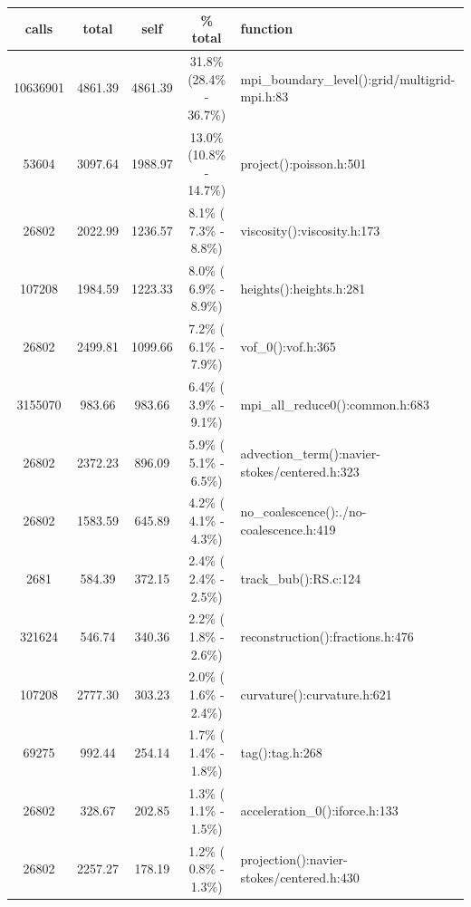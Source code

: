 \begin{table}  
\begin{tabular}{c|c|c|c|l}
  calls  &  total  &   self  & \% total  & function \\ \hline
  10636901 &  4861.39 &  4861.39  &   31.8\% (28.4\% - 36.7\%) &   mpi\_boundary\_level():grid/multigrid-mpi.h:83\\
     53604 &  3097.64 &  1988.97  &   13.0\% (10.8\% - 14.7\%) &   project():poisson.h:501\\
     26802 &  2022.99 &  1236.57  &    8.1\% ( 7.3\% -  8.8\%) &   viscosity():viscosity.h:173\\
    107208 &  1984.59 &  1223.33  &    8.0\% ( 6.9\% -  8.9\%) &   heights():heights.h:281\\
     26802 &  2499.81 &  1099.66  &    7.2\% ( 6.1\% -  7.9\%) &   vof\_0():vof.h:365\\
   3155070 &  983.66  & 983.66    &  6.4\% ( 3.9\% -  9.1\%)   & mpi\_all\_reduce0():common.h:683\\
     26802 &  2372.23 &  896.09   &   5.9\% ( 5.1\% -  6.5\%)  &  advection\_term():navier-stokes/centered.h:323\\
     26802 &  1583.59 &  645.89   &   4.2\% ( 4.1\% -  4.3\%)  &  no\_coalescence():./no-coalescence.h:419\\
      2681 &  584.39  & 372.15    &  2.4\% ( 2.4\% -  2.5\%)   & track\_bub():RS.c:124\\
    321624 &  546.74  & 340.36    &  2.2\% ( 1.8\% -  2.6\%)   & reconstruction():fractions.h:476\\
    107208 &  2777.30 &  303.23   &   2.0\% ( 1.6\% -  2.4\%)  &  curvature():curvature.h:621\\
     69275 &  992.44  & 254.14    &  1.7\% ( 1.4\% -  1.8\%)   & tag():tag.h:268\\
     26802 &  328.67  & 202.85    &  1.3\% ( 1.1\% -  1.5\%)   & acceleration\_0():iforce.h:133\\
     26802 &  2257.27 &  178.19   &   1.2\% ( 0.8\% -  1.3\%)  &  projection():navier-stokes/centered.h:430\\

\end{tabular}
\end{table}
